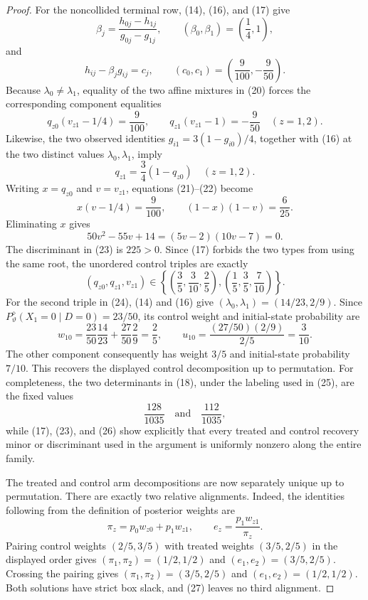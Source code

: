 \documentclass{article}
\begin{document}
\begin{proof}
For the noncollided terminal row, (14), (16), and (17) give
\[
 \beta_j=\frac{h_{0j}-h_{1j}}{g_{0j}-g_{1j}},
 \qquad (\beta_0,\beta_1)=\left(\frac14,1\right),
\]
and
\[
 h_{ij}-\beta_jg_{ij}=c_j,
 \qquad (c_0,c_1)=\left(\frac9{100},-\frac9{50}\right).
 \tag{20}
\]
Because \(\lambda_0\ne\lambda_1\), equality of the two affine mixtures in (20) forces the corresponding component equalities
\[
 q_{z0}(v_{z1}-1/4)=\frac9{100},
 \qquad q_{z1}(v_{z1}-1)=-\frac9{50}
 \quad (z=1,2).
 \tag{21}
\]
Likewise, the two observed identities \(g_{i1}=3(1-g_{i0})/4\), together with (16) at the two distinct values \(\lambda_0,\lambda_1\), imply
\[
 q_{z1}=\frac34(1-q_{z0})
 \quad (z=1,2).
 \tag{22}
\]
Writing \(x=q_{z0}\) and \(v=v_{z1}\), equations (21)--(22) become
\[
 x(v-1/4)=\frac9{100},
 \qquad (1-x)(1-v)=\frac6{25}.
\]
Eliminating \(x\) gives
\[
 50v^2-55v+14=(5v-2)(10v-7)=0.
 \tag{23}
\]
The discriminant in (23) is \(225>0\). Since (17) forbids the two types from using the same root, the unordered control triples are exactly
\[
 (q_{z0},q_{z1},v_{z1})
 \in\left\{
 \left(\frac35,\frac3{10},\frac25\right),
 \left(\frac15,\frac35,\frac7{10}\right)
 \right\}.
 \tag{24}
\]
For the second triple in (24), (14) and (16) give \((\lambda_0,\lambda_1)=(14/23,2/9)\). Since \(P^{\diamond}_{\vartheta}(X_1=0\mid D=0)=23/50\), its control weight and initial-state probability are
\[
 w_{10}=\frac{23}{50}\frac{14}{23}+\frac{27}{50}\frac29=\frac25,
 \qquad
 u_{10}=\frac{(27/50)(2/9)}{2/5}=\frac3{10}.
 \tag{25}
\]
The other component consequently has weight \(3/5\) and initial-state probability \(7/10\). This recovers the displayed control decomposition up to permutation. For completeness, the two determinants in (18), under the labeling used in (25), are the fixed values
\[
 \frac{128}{1035}\quad\text{and}\quad\frac{112}{1035},
 \tag{26}
\]
while (17), (23), and (26) show explicitly that every treated and control recovery minor or discriminant used in the argument is uniformly nonzero along the entire family.

The treated and control arm decompositions are now separately unique up to permutation. There are exactly two relative alignments. Indeed, the identities following from the definition of posterior weights are
\[
 \pi_z=p_0w_{z0}+p_1w_{z1},
 \qquad e_z=\frac{p_1w_{z1}}{\pi_z}.
 \tag{27}
\]
Pairing control weights \((2/5,3/5)\) with treated weights \((3/5,2/5)\) in the displayed order gives \((\pi_1,\pi_2)=(1/2,1/2)\) and \((e_1,e_2)=(3/5,2/5)\). Crossing the pairing gives \((\pi_1,\pi_2)=(3/5,2/5)\) and \((e_1,e_2)=(1/2,1/2)\). Both solutions have strict box slack, and (27) leaves no third alignment.


\end{proof}
\end{document}
